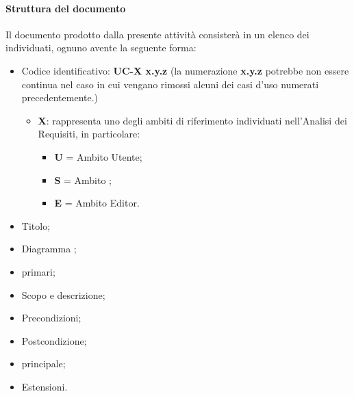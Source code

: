			\paragraph*{Struttura del documento}
			Il documento prodotto dalla presente attivit\`a consister\`a in un elenco dei  individuati, 
                        ognuno avente la seguente forma:
				\begin{itemize}
				\item Codice identificativo: \textbf{UC-{X} x.y.z} (la numerazione \textbf{x.y.z} potrebbe non essere continua nel caso in cui vengano
                                      rimossi alcuni dei casi d'uso numerati precedentemente.)
						\begin{itemize}
						\item \textbf{X}: rappresenta uno degli ambiti di riferimento individuati
						nell'Analisi dei Requisiti, in particolare:
							\begin{itemize}
							\item [] \textbf{U} = Ambito Utente;
							\item [] \textbf{S} = Ambito ;
							\item [] \textbf{E} = Ambito Editor. 
							\end{itemize}
						\end{itemize}
				\item Titolo;
				\item Diagramma ;
				\item {} primari;
				\item Scopo e descrizione;
				\item Precondizioni;
				\item Postcondizione;
				\item {} principale;
                                \item Estensioni.
				\end{itemize}

